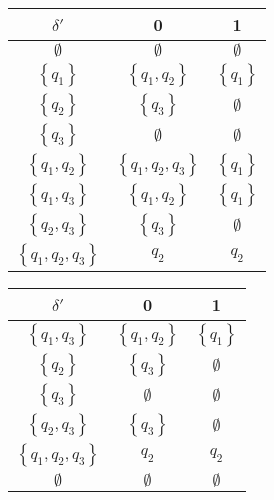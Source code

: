 \documentclass[
	final,
	a4paper,
	oneside,
	parskip=full,
	headings=standardclasses,
	headings=big,
	pointednumbers
]{scrartcl}
\begin{document}
	\begin{minipage}{0.5\textwidth}
        \begin{tabular}{c|cc}
            $ \delta' $                          & 0                                 & 1                         \\
            \hline
            $ \emptyset $                       & $\emptyset$                       & $\emptyset$               \\
            $ \left\{ q_1 \right\} $            & $\left\{ q_1, q_2 \right\}$       & $\left\{ q_1 \right\}$    \\
            $ \left\{ q_2 \right\} $            & $ \left\{ q_3 \right\}$           & $\emptyset$               \\
            $ \left\{ q_3 \right\} $            & $\emptyset$                       & $\emptyset$               \\
            $ \left\{ q_1, q_2 \right\} $       & $\left\{ q_1, q_2, q_3 \right\}$  & $\left\{ q_1 \right\}$    \\
            $ \left\{ q_1, q_3 \right\} $       & $\left\{ q_1, q_2 \right\}$       & $\left\{ q_1 \right\}$    \\
            $ \left\{ q_2, q_3 \right\} $       & $\left\{ q_3 \right\}$            & $\emptyset$               \\
            $ \left\{ q_1, q_2, q_3 \right\} $  & $q_2$ & $q_2$
        \end{tabular}
	\end{minipage}
	\begin{minipage}{0.5\textwidth}
        \begin{tabular}{c|cc}
            $ \delta' $                          & 0                                 & 1                         \\
            \hline
            $ \left\{ q_1, q_3 \right\} $       & $\left\{ q_1, q_2 \right\}$       & $\left\{ q_1 \right\}$    \\
            $ \left\{ q_2 \right\} $            & $ \left\{ q_3 \right\}$           & $\emptyset$               \\
            $ \left\{ q_3 \right\} $            & $\emptyset$                       & $\emptyset$               \\
            $ \left\{ q_2, q_3 \right\} $       & $\left\{ q_3 \right\}$            & $\emptyset$               \\
            $ \left\{ q_1, q_2, q_3 \right\} $  & $q_2$                             & $q_2$                     \\
            $ \emptyset $                       & $\emptyset$                       & $\emptyset$
        \end{tabular}
	\end{minipage}
\end{document}
